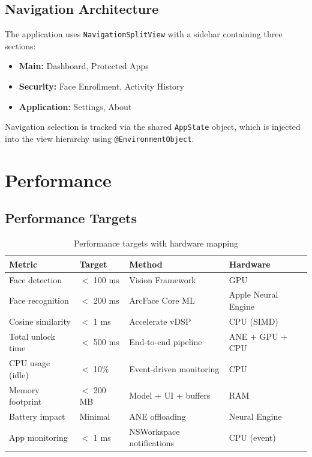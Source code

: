 \documentclass[12pt,a4paper]{report}
\begin{document}
\section{Navigation Architecture}
The application uses \texttt{NavigationSplitView} with a sidebar containing three sections:

\begin{itemize}[noitemsep]
    \item \textbf{Main:} Dashboard, Protected Apps
    \item \textbf{Security:} Face Enrollment, Activity History
    \item \textbf{Application:} Settings, About
\end{itemize}

Navigation selection is tracked via the shared \texttt{AppState} object, which is injected into the view hierarchy using \texttt{@EnvironmentObject}.

\chapter{Performance}

\section{Performance Targets}
\begin{table}[H]
\centering
\begin{tabular}{llll}
\toprule
\textbf{Metric} & \textbf{Target} & \textbf{Method} & \textbf{Hardware} \\
\midrule
Face detection & $<$ 100 ms & Vision Framework & GPU \\
Face recognition & $<$ 200 ms & ArcFace Core ML & Apple Neural Engine \\
Cosine similarity & $<$ 1 ms & Accelerate vDSP & CPU (SIMD) \\
Total unlock time & $<$ 500 ms & End-to-end pipeline & ANE + GPU + CPU \\
CPU usage (idle) & $<$ 10\% & Event-driven monitoring & CPU \\
Memory footprint & $<$ 200 MB & Model + UI + buffers & RAM \\
Battery impact & Minimal & ANE offloading & Neural Engine \\
App monitoring & $<$ 1 ms & NSWorkspace notifications & CPU (event) \\
\bottomrule
\end{tabular}
\caption{Performance targets with hardware mapping}
\end{table}
\end{document}
